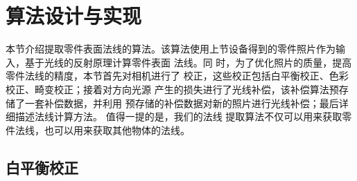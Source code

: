 \section{算法设计与实现}

本节介绍提取零件表面法线的算法。该算法使用上节设备得到的零件照片作为输入，基于光线的反射原理计算零件表面
法线。同
时，为了优化照片的质量，提高零件法线的精度，本节首先对相机进行了
校正，这些校正包括白平衡校正、色彩校正、畸变校正；接着对方向光源
产生的损失进行了光线补偿，该补偿算法预存储了一套补偿数据，并利用
预存储的补偿数据对新的照片进行光线补偿；最后详细描述法线计算方法。
值得一提的是，我们的法线
提取算法不仅可以用来获取零件法线，也可以用来获取其他物体的法线。

\subsection{白平衡校正}

